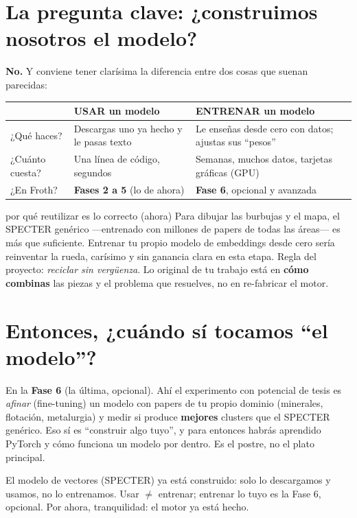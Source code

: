 \documentclass[11pt,a4paper]{article}
\begin{document}
\section{La pregunta clave: ¿construimos nosotros el modelo?}

\textbf{No.} Y conviene tener clarísima la diferencia entre dos cosas que suenan parecidas:

\begin{center}
\begin{tabular}{p{4.3cm} p{4.3cm} p{4.3cm}}
 & \textbf{USAR un modelo} & \textbf{ENTRENAR un modelo} \\[2pt]
\hline
¿Qué haces? & Descargas uno ya hecho y le pasas texto & Le enseñas desde cero con datos; ajustas sus ``pesos'' \\[6pt]
¿Cuánto cuesta? & Una línea de código, segundos & Semanas, muchos datos, tarjetas gráficas (GPU) \\[6pt]
¿En Froth? & \textbf{Fases 2 a 5} (lo de ahora) & \textbf{Fase 6}, opcional y avanzada \\
\end{tabular}
\end{center}

\begin{concepto}{por qué reutilizar es lo correcto (ahora)}
Para dibujar las burbujas y el mapa, el SPECTER genérico —entrenado con millones de papers
de todas las áreas— es más que suficiente. Entrenar tu propio modelo de embeddings desde
cero sería reinventar la rueda, carísimo y sin ganancia clara en esta etapa. Regla del
proyecto: \emph{reciclar sin vergüenza}. Lo original de tu trabajo está en \textbf{cómo
combinas} las piezas y el problema que resuelves, no en re-fabricar el motor.
\end{concepto}

\section{Entonces, ¿cuándo sí tocamos ``el modelo''?}

En la \textbf{Fase 6} (la última, opcional). Ahí el experimento con potencial de tesis es
\emph{afinar} (fine-tuning) un modelo con papers de tu propio dominio (minerales, flotación,
metalurgia) y medir si produce \textbf{mejores} clusters que el SPECTER genérico. Eso sí es
``construir algo tuyo'', y para entonces habrás aprendido PyTorch y cómo funciona un modelo
por dentro. Es el postre, no el plato principal.

\begin{resumen}
El modelo de vectores (SPECTER) ya está construido: solo lo descargamos y usamos, no lo
entrenamos. Usar $\neq$ entrenar; entrenar lo tuyo es la Fase 6, opcional. Por ahora,
tranquilidad: el motor ya está hecho.
\end{resumen}
\end{document}
